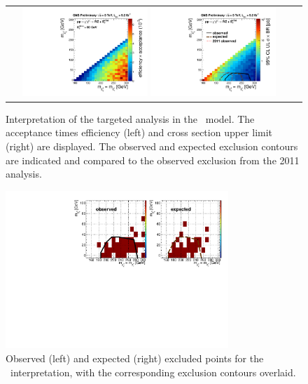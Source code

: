 \begin{figure}[!ht]
\begin{center}
\begin{tabular}{cc}
\includegraphics[width=0.45\textwidth]{plots/wzsms_eff.pdf}
\includegraphics[width=0.45\textwidth]{plots/wzsms_xsec.pdf}
\end{tabular}
\caption{ Interpretation of the targeted analysis in the \wzmet\ model. The acceptance times efficiency (left) and cross section
upper limit (right) are displayed. The observed and expected exclusion contours are indicated and compared to the observed
exclusion from the 2011 analysis. 
\label{fig:results_wzmet}}
\end{center}
\end{figure}

\begin{figure}[!hb]
\begin{center}
\includegraphics[width=0.75\textwidth]{plots/wzsms_points.pdf}
\caption{ Observed (left) and expected (right) excluded points for the \wzmet\ interpretation, with the corresponding exclusion contours overlaid.
\label{fig:results_wzmetpoints}}
\end{center}
\end{figure}

